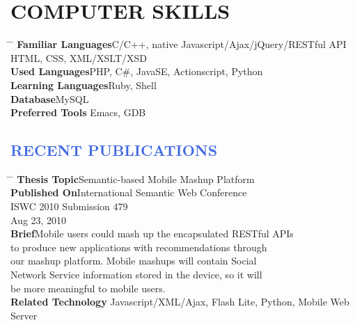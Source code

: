 \documentclass{res}
\begin{document}
\begin{resume}
{\section{COMPUTER SKILLS}
}
\vspace{-0.1in}
\begin{tabbing}
  \hspace{2.3in} \= \hspace{2.6in} \= \kill
         {\bf Familiar Languages}\>C/C++, native Javascript/Ajax/jQuery/RESTful API\\
         \>HTML, CSS, XML/XSLT/XSD\\
               {\bf Used Languages}\>PHP, C\#, JavaSE, Actionscript, Python\\
               {\bf Learning Languages}\>Ruby, Shell\\
               {\bf Database}\>MySQL\\
               {\bf Preferred Tools}\> Emacs, GDB\\
\end{tabbing}
\vspace{-20pt}          
 
\textcolor{RoyalBlue}{
\section{RECENT PUBLICATIONS}
}
\vspace{-0.1in}
\begin{tabbing}
  \hspace{2.3in} \= \hspace{2.6in} \= \kill
         {\bf Thesis Topic}\>Semantic-based Mobile Mashup Platform\\
         {\bf Published On}\>International Semantic Web Conference\\
         \>ISWC 2010 Submission 479\\
         \>Aug 23, 2010\\
               {\bf Brief}\>Mobile users could mash up the encapsulated RESTful APIs\\
               \>to produce new applications with recommendations through\\
               \>our mashup platform. Mobile mashups will contain Social\\
               \>Network Service information stored in the device, so it will\\
               \>be more meaningful to mobile users.\\
                    {\bf Related Technology}\> Javascript/XML/Ajax, Flash Lite, Python, Mobile Web Server\\
                    \end{tabbing}
\vspace{-20pt}


\end{resume}
\end{document}
